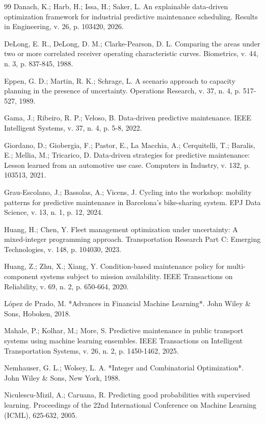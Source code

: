 \documentclass[12pt,a4paper]{article}
\begin{document}
\begin{thebibliography}{99}
 Danach, K.; Harb, H.; Issa, H.; Saker, L. An explainable data-driven optimization framework for industrial predictive maintenance scheduling. Results in Engineering, v. 26, p. 103420, 2026.

 DeLong, E. R., DeLong, D. M.; Clarke-Pearson, D. L. Comparing the areas under two or more correlated receiver operating characteristic curves. Biometrics, v. 44, n. 3, p. 837-845, 1988.

 Eppen, G. D.; Martin, R. K.; Schrage, L. A scenario approach to capacity planning in the presence of uncertainty. Operations Research, v. 37, n. 4, p. 517-527, 1989.

 Gama, J.; Ribeiro, R. P.; Veloso, B. Data-driven predictive maintenance. IEEE Intelligent Systems, v. 37, n. 4, p. 5-8, 2022.

 Giordano, D.; Giobergia, F.; Pastor, E., La Macchia, A.; Cerquitelli, T.; Baralis, E.; Mellia, M.; Tricarico, D. Data-driven strategies for predictive maintenance: Lesson learned from an automotive use case. Computers in Industry, v. 132, p. 103513, 2021.

 Grau-Escolano, J.; Bassolas, A.; Vicens, J. Cycling into the workshop: mobility patterns for predictive maintenance in Barcelona's bike-sharing system. EPJ Data Science, v. 13, n. 1, p. 12, 2024.

 Huang, H.; Chen, Y. Fleet management optimization under uncertainty: A mixed-integer programming approach. Transportation Research Part C: Emerging Technologies, v. 148, p. 104030, 2023.

 Huang, Z.; Zhu, X.; Xiang, Y. Condition-based maintenance policy for multi-component systems subject to mission availability. IEEE Transactions on Reliability, v. 69, n. 2, p. 650-664, 2020.

 López de Prado, M. *Advances in Financial Machine Learning*. John Wiley \& Sons, Hoboken, 2018.

 Mahale, P.; Kolhar, M.; More, S. Predictive maintenance in public transport systems using machine learning ensembles. IEEE Transactions on Intelligent Transportation Systems, v. 26, n. 2, p. 1450-1462, 2025.

 Nemhauser, G. L.; Wolsey, L. A. *Integer and Combinatorial Optimization*. John Wiley \& Sons, New York, 1988.

 Niculescu-Mizil, A.; Caruana, R. Predicting good probabilities with supervised learning. Proceedings of the 22nd International Conference on Machine Learning (ICML), 625-632, 2005.


\end{thebibliography}
\end{document}
